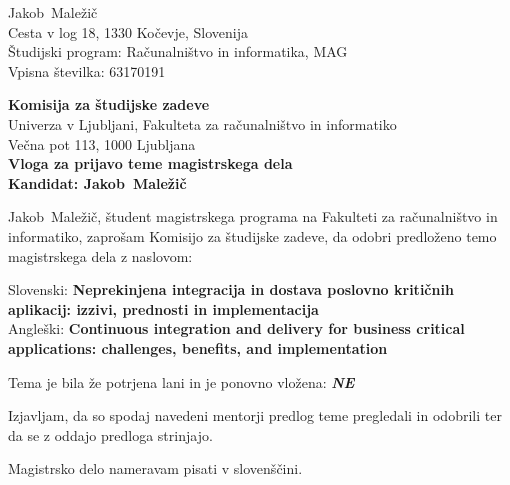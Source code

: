 \documentclass[a4paper, 12pt]{article}
\begin{document}
\newcommand{\ImeKandidata}{Jakob} %
\newcommand{\PriimekKandidata}{Maležič} %
\newcommand{\VpisnaStevilka}{63170191} %
\newcommand{\StudijskiProgram}{Računalništvo in informatika, MAG} %
\newcommand{\NaslovBivalisca}{ Cesta v log 18, 1330 Kočevje, Slovenija } %
\newcommand{\SLONaslov}{Neprekinjena integracija in dostava poslovno kritičnih aplikacij: izzivi, prednosti in implementacija} %
\newcommand{\ENGNaslov}{Continuous integration and delivery for business critical applications: challenges, benefits, and implementation} %


\newcommand{\Kandidat}{\ImeKandidata~\PriimekKandidata}
\noindent
\Kandidat\\
\NaslovBivalisca \\
Študijski program: \StudijskiProgram \\
Vpisna številka: \VpisnaStevilka
\bigskip

{\bf Komisija za študijske zadeve}\\
Univerza v Ljubljani, Fakulteta za računalništvo in informatiko\\
Večna pot 113, 1000 Ljubljana\\

{\Large\bf
{\centering
    Vloga za prijavo teme magistrskega dela \\%
\large Kandidat: \Kandidat \\[10mm]}}


\Kandidat, študent magistrskega programa na Fakulteti za računalništvo in informatiko, zaprošam Komisijo za študijske zadeve, da odobri predloženo temo magistrskega dela z naslovom:

Slovenski: {\bf \SLONaslov}\\
Angleški: {\bf \ENGNaslov}

Tema je bila že potrjena lani in je ponovno vložena: {\bf \textit{NE}}

Izjavljam, da so spodaj navedeni mentorji predlog teme pregledali in odobrili ter da se z oddajo predloga strinjajo.

Magistrsko delo nameravam pisati v slovenščini. %
\end{document}

